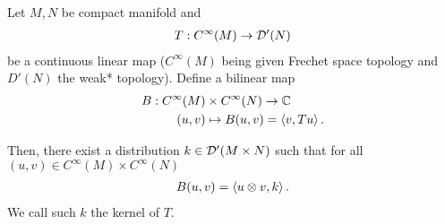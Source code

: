 \documentclass[12pt]{article}
\begin{document}
\begin{ftheorem} Let $M, N$ be compact manifold and 
    \begin{align*}
        T: C^\infty(M) \to \D'(N) \\
    \end{align*}
    be a continuous linear map ($C^\infty(M)$ being given Frechet space topology and $D'(N)$ the weak* topology). Define a bilinear map 
    \begin{align*}
        B: C^\infty(M) &\times C^\infty(N) \to \C \\
        (u, v) &\mapsto B(u, v) = \inprod[v, Tu]. 
    \end{align*}
    
    Then, there exist a distribution $k \in \D'(M \times N)$ such that for all $(u, v) \in C^\infty(M) \times C^\infty(N)$
    \begin{align*}
        B(u, v) = \inprod[u \otimes v, k]. 
    \end{align*}
    We call such $k$ the kernel of $T$. 
\end{ftheorem}

\end{document}
